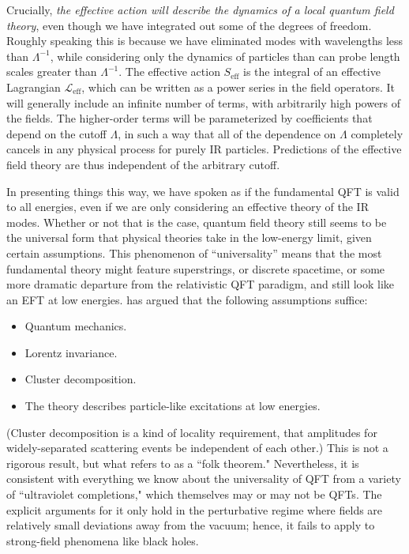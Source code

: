 \documentclass[12pt,letterpaper]{article}
\newcommand{\lag}{{\mathcal L}}
\newcommand{\eff}{{\mathrm{eff}}}
\begin{document}
Crucially, \emph{the effective action will describe the dynamics of a local quantum field theory}, even though we have integrated out some of the degrees of freedom.
Roughly speaking this is because we have eliminated modes with wavelengths less than $\Lambda^{-1}$, while considering only the dynamics of particles than can probe length scales greater than $\Lambda^{-1}$.
The effective action $S_\eff$ is the integral of an effective Lagrangian $\lag_\eff$, which can be written as a power series in the field operators.
It will generally include an infinite number of terms, with arbitrarily high powers of the fields.
The higher-order terms will be parameterized by coefficients that depend on the cutoff $\Lambda$, in such a way that all of the dependence on $\Lambda$ completely cancels in any physical process for purely IR particles.
Predictions of the effective field theory are thus independent of the arbitrary cutoff.

In presenting things this way, we have spoken as if the fundamental QFT is valid to all energies, even if we are only considering an effective theory of the IR modes.
Whether or not that is the case, quantum field theory still seems to be the universal form that physical theories take in the low-energy limit, given certain assumptions.
This phenomenon of ``universality'' means that the most fundamental theory might feature superstrings, or discrete spacetime, or some more dramatic departure from the relativistic QFT paradigm, and still look like an EFT at low energies.
 \citet{weinberg1995quantum} has argued that the following assumptions suffice:
\begin{itemize}
\item Quantum mechanics.
\item Lorentz invariance.
\item Cluster decomposition.
\item The theory describes particle-like excitations at low energies.
\end{itemize}
(Cluster decomposition is a kind of locality requirement, that amplitudes for widely-separated scattering events be independent of each other.)
This is not a rigorous result, but what \citet{Weinberg:1996kw} refers to as a ``folk theorem." 
Nevertheless, it is consistent with everything we know about the universality of QFT from a variety of ``ultraviolet completions," which themselves may or may not be QFTs.
The explicit arguments for it only hold in the perturbative regime where fields are relatively small deviations away from the vacuum; hence, it fails to apply to strong-field phenomena like black holes.
\end{document}
